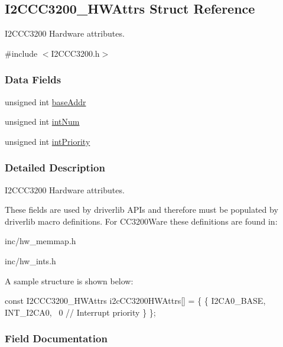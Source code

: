 \subsection{I2\+C\+C\+C3200\+\_\+\+H\+W\+Attrs Struct Reference}
\label{struct_i2_c_c_c3200___h_w_attrs}


I2\+C\+C\+C3200 Hardware attributes.  




{\ttfamily \#include $<$I2\+C\+C\+C3200.\+h$>$}

\subsubsection*{Data Fields}
\begin{DoxyCompactItemize}
\item 
unsigned int \hyperlink{struct_i2_c_c_c3200___h_w_attrs_aad58884ee0e40e6b4eda27d212c0339b}{base\+Addr}
\item 
unsigned int \hyperlink{struct_i2_c_c_c3200___h_w_attrs_a944246733bda012f41d4eb1b9b4b3b8b}{int\+Num}
\item 
unsigned int \hyperlink{struct_i2_c_c_c3200___h_w_attrs_af3153448f4918bfde5041a411c984daf}{int\+Priority}
\end{DoxyCompactItemize}


\subsubsection{Detailed Description}
I2\+C\+C\+C3200 Hardware attributes. 

These fields are used by driverlib A\+P\+Is and therefore must be populated by driverlib macro definitions. For C\+C3200\+Ware these definitions are found in\+:
\begin{DoxyItemize}
\item inc/hw\+\_\+memmap.\+h
\item inc/hw\+\_\+ints.\+h
\end{DoxyItemize}

A sample structure is shown below\+: 
\begin{DoxyCode}
\textcolor{keyword}{const} I2CCC3200_HWAttrs i2cCC3200HWAttrs[] = \{
    \{
        I2CA0\_BASE,
        INT\_I2CA0,
        ~0               \textcolor{comment}{// Interrupt priority}
    \}
\};
\end{DoxyCode}
 

\subsubsection{Field Documentation}

